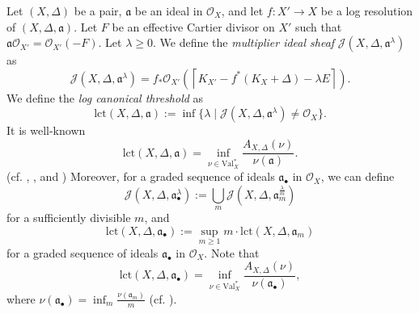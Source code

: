 \documentclass[a4paper,12pt]{amsart}
\theoremstyle{definition} %
\newtheorem{definition}[theorem]{Definition}
\theoremstyle{remark}
\numberwithin{equation}{section}
\newcommand{\ceil}[1]{\left\lceil #1 \right \rceil}
\begin{document}
\smallskip

Let $(X,\Delta)$ be a pair, $\mathfrak{a}$ be an ideal in $\mathcal{O}_X$, and let $f:X'\to X$ be a log resolution of $(X,\Delta,\mathfrak{a})$. Let $F$ be an effective Cartier divisor on $X'$ such that $\mathfrak{a}\mathcal{O}_{X'}=\mathcal{O}_{X'}(-F)$. Let $\lambda\ge 0$. We define the \emph{multiplier ideal sheaf} $\mathcal{J}(X,\Delta,\mathfrak{a}^{\lambda})$ as
$$ \mathcal{J}(X,\Delta,\mathfrak{a}^{\lambda})=f_*\mathcal{O}_{X'}(\ceil{K_{X'}-f^*(K_X+\Delta)-\lambda E}).$$
We define the \emph{log canonical threshold} as
$$ \mathrm{lct}(X,\Delta,\mathfrak{a}):=\inf\{\lambda\mid \mathcal{J}(X,\Delta,\mathfrak{a}^{\lambda})\ne \mathcal{O}_X\}.$$
It is well-known
$$ \mathrm{lct}(X,\Delta,\mathfrak{a})=\inf_{\nu\in \mathrm{Val}^*_X}\frac{A_{X,\Delta}(\nu)}{\nu(\mathfrak{a})}.$$
(cf. \cite[Corollary 6.9]{JM12}, \cite[Lemma 3.4]{Kim26}, and \cite[Theorem 3.7]{CJKL25}) Moreover, for a graded sequence of ideals $\mathfrak{a}_{\bullet}$ in $\mathcal{O}_X$, we can define
$$ \mathcal{J}(X,\Delta,\mathfrak{a}^{\lambda}_{\bullet}):=\bigcup_{m}\mathcal{J}(X,\Delta,\mathfrak{a}^{\frac{\lambda}{m}}_m)$$
for a sufficiently divisible $m$, and
$$ \mathrm{lct}(X,\Delta,\mathfrak{a}_{\bullet}):=\sup_{m\ge 1}m\cdot \mathrm{lct}(X,\Delta,\mathfrak{a}_m) $$
for a graded sequence of ideals $\mathfrak{a}_{\bullet}$ in $\mathcal{O}_X$. Note that
$$ \mathrm{lct}(X,\Delta,\mathfrak{a}_{\bullet})=\inf_{\nu\in \mathrm{Val}^*_X}\frac{A_{X,\Delta}(\nu)}{\nu(\mathfrak{a}_{\bullet})},$$
where $\nu(\mathfrak{a}_{\bullet})=\inf_m\frac{\nu(\mathfrak{a}_m)}{m}$ (cf. \cite[Chapter 1]{Xu25}).



\end{document}
